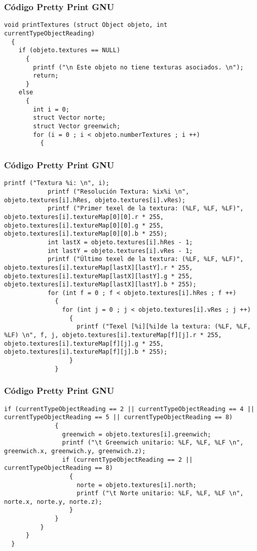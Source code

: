 \documentclass{beamer}
\begin{document}
\begin{frame}[fragile]
\frametitle{C\'odigo Pretty Print GNU}
\begin{lstlisting}[style=CStyle]
void printTextures (struct Object objeto, int currentTypeObjectReading)
  {
    if (objeto.textures == NULL)
      {
        printf ("\n Este objeto no tiene texturas asociados. \n");
        return;
      }
    else
      {
        int i = 0;
        struct Vector norte;
        struct Vector greenwich;
        for (i = 0 ; i < objeto.numberTextures ; i ++)
          {
            \end{lstlisting}
\end{frame}
\begin{frame}[fragile]
\frametitle{C\'odigo Pretty Print GNU}
\begin{lstlisting}[style=CStyle]
            printf ("Textura %i: \n", i);
            printf ("Resolución Textura: %ix%i \n", objeto.textures[i].hRes, objeto.textures[i].vRes);
            printf ("Primer texel de la textura: (%LF, %LF, %LF)", objeto.textures[i].textureMap[0][0].r * 255, objeto.textures[i].textureMap[0][0].g * 255, objeto.textures[i].textureMap[0][0].b * 255);
            int lastX = objeto.textures[i].hRes - 1;
            int lastY = objeto.textures[i].vRes - 1;
            printf ("Último texel de la textura: (%LF, %LF, %LF)", objeto.textures[i].textureMap[lastX][lastY].r * 255, objeto.textures[i].textureMap[lastX][lastY].g * 255, objeto.textures[i].textureMap[lastX][lastY].b * 255);
            for (int f = 0 ; f < objeto.textures[i].hRes ; f ++)
              {
                for (int j = 0 ; j < objeto.textures[i].vRes ; j ++)
                  {
                    printf ("Texel [%i][%i]de la textura: (%LF, %LF, %LF) \n", f, j, objeto.textures[i].textureMap[f][j].r * 255, objeto.textures[i].textureMap[f][j].g * 255, objeto.textures[i].textureMap[f][j].b * 255);
                  }
              }
\end{lstlisting}
\end{frame}
\begin{frame}[fragile]
\frametitle{C\'odigo Pretty Print GNU}
\begin{lstlisting}[style=CStyle]
            if (currentTypeObjectReading == 2 || currentTypeObjectReading == 4 || currentTypeObjectReading == 5 || currentTypeObjectReading == 8)
              {
                greenwich = objeto.textures[i].greenwich;
                printf ("\t Greenwich unitario: %LF, %LF, %LF \n", greenwich.x, greenwich.y, greenwich.z);
                if (currentTypeObjectReading == 2 || currentTypeObjectReading == 8)
                  {
                    norte = objeto.textures[i].north;
                    printf ("\t Norte unitario: %LF, %LF, %LF \n", norte.x, norte.y, norte.z);
                  }
              }
          }
      }
  }
\end{lstlisting}
\end{frame}
\end{document}
